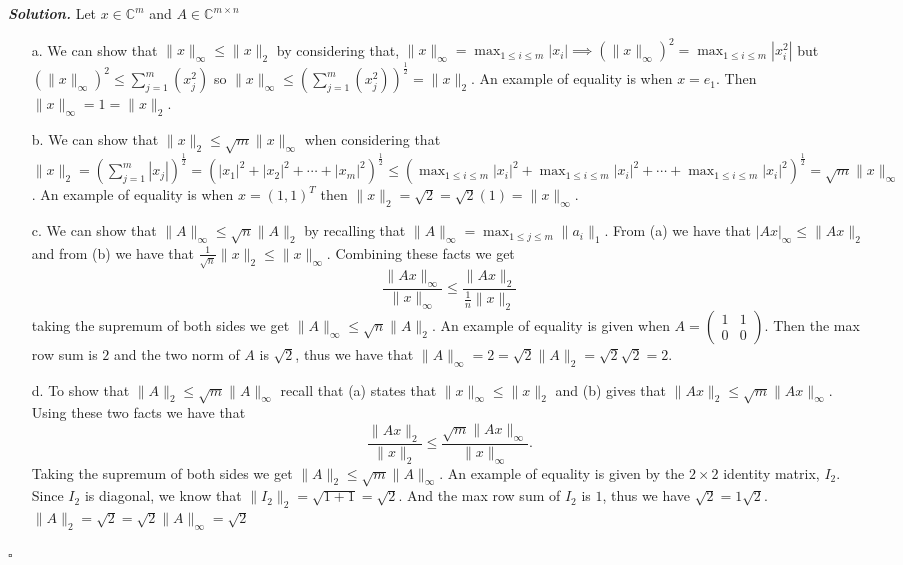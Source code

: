 \documentclass[12pt]{report}
\newenvironment{solution}[1][\it{Solution}]{\textbf{#1. } }{$\square$}
\def\C{{\mathbb C}}
\begin{document}
\begin{solution}
    \noindent
    Let $x \in \C^m$ and $A \in \C^{m \times n}$
    \begin{enumerate}
        \item [a.] We can show that $\|x\|_\infty \leq \|x\|_2$ by considering that, $\|x\|_\infty = \max_{1 \leq i \leq m} |x_i|  \implies (\|x\|_\infty)^2 = \max_{1 \leq i \leq m}|x_i^2|$ but $(\|x\|_\infty)^2 \leq \sum_{j=1}^m(x_j^2)$ so $\|x\|_\infty \leq \left( \sum_{j=1}^m(x_j^2) \right)^\frac{1}{2} = \| x \|_2$. An example of equality is when $x = e_1$. Then $\|x\|_\infty = 1 = \|x\|_2$. 
        \item [b.] We can show that $\|x\|_2 \leq \sqrt{m}\|x\|_\infty$ when considering that $\| x \|_2 = \left( \sum_{j=1}^m |x_j|\right)^\frac{1}{2} = \left( |x_1|^2 + |x_2|^2 + \cdots + |x_m|^2 \right)^\frac{1}{2} \leq \left( \max_{1 \leq i \leq m} |x_i|^2 + \max_{1 \leq i \leq m} |x_i|^2 + \cdots + \max_{1 \leq i \leq m} |x_i|^2\right)^\frac{1}{2} = \sqrt{m}\|x\|_\infty$. An example of equality is when $x = ( 1,1 )^T$ then $\|x\|_2 = \sqrt{2} = \sqrt{2} (1) = \|x\|_\infty$.
        \item [c.] We can show that $\|A\|_\infty \leq \sqrt{n} \|A\|_2$ by recalling that $\|A\|_\infty = \max_{1 \leq j \leq m}\|a_i\|_1$. From (a) we have that $|Ax|_\infty \leq \|Ax\|_2$ and from (b) we have that $\frac{1}{\sqrt{n}}\|x\|_2 \leq \|x\|_\infty$. Combining these facts we get $$\frac{\|Ax\|_\infty}{\|x\|_\infty} \leq \frac{\|Ax\|_2}{\frac{1}{n}\|x\|_2}$$ taking the supremum of both sides we get $\|A\|_\infty \leq \sqrt{n} \|A\|_2$. An example of equality is given when $A = \begin{pmatrix} 1&1\\0&0 \end{pmatrix}$. Then the max row sum is $2$ and the two norm of $A$ is $\sqrt{2}$, thus we have that $\|A\|_\infty = 2 = \sqrt{2} \|A\|_2 = \sqrt{2}\sqrt{2} = 2$.
        \item [d.] To show that $\|A\|_2 \leq \sqrt{m} \| A \|_\infty$ recall that (a) states that $\|x\|_\infty \leq \|x\|_2$ and (b) gives that $\|Ax\|_2 \leq \sqrt{m} \|Ax\|_\infty$. Using these two facts we have that $$\frac{\|Ax\|_2}{\|x\|_2} \leq \frac{\sqrt{m}\|Ax\|_\infty}{\|x\|_\infty}.$$ Taking the supremum of both sides we get $\|A\|_2 \leq \sqrt{m} \| A \|_\infty$. An example of equality is given by the $2\times 2$ identity matrix, $I_2$. Since $I_2$ is diagonal, we know that $\|I_2\|_2 = \sqrt{1 + 1}  = \sqrt{2}$. And the max row sum of $I_2$ is $1$, thus we have $\sqrt{2} = 1 \sqrt{2}$. $\|A\|_2 = \sqrt{2} = \sqrt{2} \| A \|_\infty = \sqrt{2}$
    \end{enumerate}
\end{solution}
\end{document}
